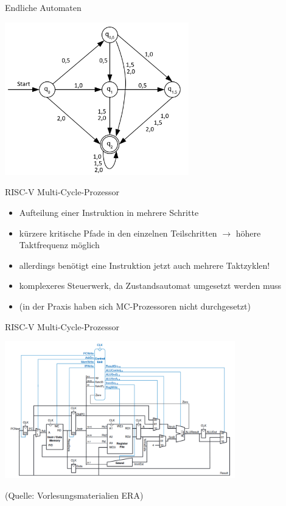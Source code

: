 \documentclass[
  german,            %
  aspectratio=169,    %
]{tumbeamer}
\begin{document}
\begin{frame}[fragile, c]{Endliche Automaten}{}
  \begin{center}
    \includegraphics[width=0.6\textwidth]{w08_finite_state_machine.png}
  \end{center}
\end{frame}


\begin{frame}[c, fragile]{RISC-V Multi-Cycle-Prozessor}{}
  \begin{itemize}
    \item Aufteilung einer Instruktion in mehrere Schritte
    \item kürzere kritische Pfade in den einzelnen Teilschritten $\rightarrow$ höhere Taktfrequenz möglich
    \item allerdings benötigt eine Instruktion jetzt auch mehrere Taktzyklen!
    \item komplexeres Steuerwerk, da Zustandsautomat umgesetzt werden muss
    \item (in der Praxis haben sich MC-Prozessoren nicht durchgesetzt)
  \end{itemize}
\end{frame}

\begin{frame}[c]{RISC-V Multi-Cycle-Prozessor}{}
  \begin{center}
    \includegraphics[width=0.75\textwidth]{w08_multi_cycle.png}
  \end{center}
  \centering
  \tiny (Quelle: Vorlesungsmaterialien ERA)
\end{frame}
\end{document}

